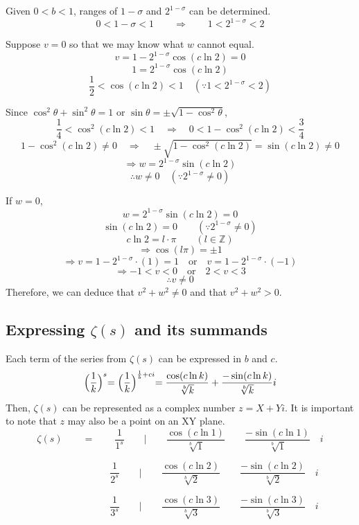 \documentclass{amsart}
\begin{document}
	Given $ 0 < b < 1 $, ranges of $1-\sigma$ and $2^{1-\sigma}$ can be determined.
	\[ 0 < 1-\sigma < 1 \qquad \Rightarrow \qquad 1 < 2^{1-\sigma} < 2 \]
	
	Suppose $v=0$ so that we may know what $w$ cannot equal.
	\[ v = 1 - 2^{1-\sigma}\cos(c \ln 2) = 0 \]
	\[ 1 = 2^{1-\sigma}\cos(c \ln 2) \]
	\[ \frac{1}{2} < \cos(c \ln 2) < 1 \quad (\because 1 < 2^{1-\sigma} < 2) \]
	
	Since $\cos^2\theta + \sin^2\theta = 1$ or $ \sin\theta = \pm \sqrt{1-\cos^2{\theta}} $,
	\[ \frac{1}{4} < \cos^2(c \ln 2) < 1 \quad \Rightarrow \quad 0 < 1 - \cos^2(c \ln 2) < \frac{3}{4} \]
	\[ 1 - \cos^2(c \ln 2) \neq 0 \quad \Rightarrow \quad \pm\sqrt{1 - \cos^2(c \ln 2)} = \sin(c \ln 2) \neq 0 \]
	\[ \Rightarrow w = 2^{1-\sigma}\sin(c \ln 2) \]
	\[ \therefore w \neq 0 \quad (\because 2^{1-\sigma} \neq 0) \]
	
	If $w=0$,
	\[ w = 2^{1-\sigma}\sin(c \ln 2) = 0 \]
	\[ \sin(c \ln 2) = 0 \qquad (\because 2^{1-\sigma} \neq 0) \]
	\[ c \ln 2 = l\cdot\pi \qquad (l \in \mathbb{Z}) \]
	\[ \Rightarrow \cos(l\pi) = \pm 1 \]
	\[ \Rightarrow v = 1 - 2^{1-\sigma} \cdot (1) = 1 \quad \text{or} \quad v = 1 - 2^{1-\sigma} \cdot (-1) \]	
	\[ \Rightarrow -1 < v < 0 \quad \text{or} \quad 2 < v < 3  \]	
	\[ \therefore v \neq 0 \]
	\[\]
	Therefore, we can deduce that $v^2 + w^2 \neq 0$ and that $v^2 + w^2 > 0$.
	
	
	\subsection{Expressing $\zeta(s)$ and its summands}
	Each term of the series from $\zeta(s)$ can be expressed in $b$ and $c$.
	\[ \Bigl( \frac{1}{k} \Bigl)^s = \Bigl( \frac{1}{k} \Bigl)^{\frac{1}{b} + ci} = \frac{\cos({c\ln k})}{\sqrt[b]{k}} + \frac{-\sin({c\ln k})}{\sqrt[b]{k}} i \]
	Then, $\zeta(s)$ can be represented as a complex number $z = X + Yi$. It is important to note that $z$ may also be a point on an XY plane.
	\[ \zeta(s) \qquad = \qquad \frac{1}{1^s} \qquad \Big|  \qquad \frac{\cos({c\ln 1})}{\sqrt[b]{1}} \qquad \frac{-\sin({c\ln 1})}{\sqrt[b]{1}} \quad i  \]
	
	\[ \quad \qquad  \qquad \qquad \frac{1}{2^s} \qquad \Big|  \qquad \frac{\cos({c\ln 2})}{\sqrt[b]{2}} \qquad \frac{-\sin({c\ln 2})}{\sqrt[b]{2}} \quad i  \]
	
	\[ \quad \qquad  \qquad \qquad \frac{1}{3^s} \qquad \Big|  \qquad \frac{\cos({c\ln 3})}{\sqrt[b]{3}} \qquad \frac{-\sin({c\ln 3})}{\sqrt[b]{3}} \quad i  \]
	
\end{document}
